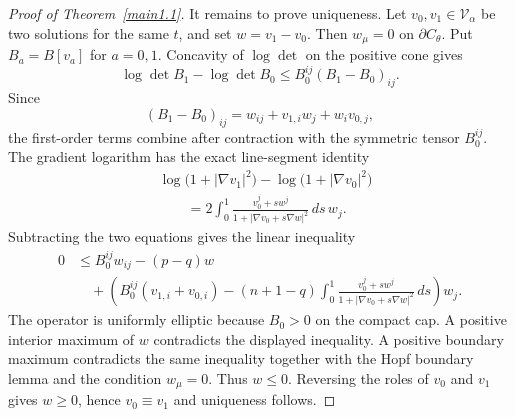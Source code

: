 \documentclass[11pt]{amsart}
\numberwithin{equation} {section}
\numberwithin{equation}{section}
\begin{document}
\begin{proof}[Proof of Theorem~\ref{main1.1}]
\enlargethispage{\baselineskip}
It remains to prove uniqueness. Let $v_0,v_1\in\mathcal V_{\alpha}$ be two
solutions for the same $t$, and set $w=v_1-v_0$. Then $w_{\mu}=0$ on
$\partial C_{\theta}$. Put $B_a=B[v_a]$ for $a=0,1$. Concavity of $\log\det$ on
the positive cone gives
\[
        \log\det B_1-\log\det B_0
        \leq B_0^{ij}(B_1-B_0)_{ij}.
\]
Since
\[
        (B_1-B_0)_{ij}=w_{ij}+v_{1,i}w_j+w_i v_{0,j},
\]
the first-order terms combine after contraction with the symmetric tensor
$B_0^{ij}$. The gradient logarithm has the exact line-segment identity
\[
\begin{split}
        &\log\bigl(1+|\nabla v_1|^2\bigr)
        -\log\bigl(1+|\nabla v_0|^2\bigr)\\
        &\qquad =
        2\int_0^1
        \frac{v_0^j+s w^j}{1+|\nabla v_0+s\nabla w|^2}\,ds\, w_j.
\end{split}
\]
Subtracting the two equations gives the linear inequality
\begin{equation}\label{comparison inequality}
\begin{split}
        0&\leq B_0^{ij}w_{ij}-(p-q)w\\
        &\quad+\left(B_0^{ij}(v_{1,i}+v_{0,i})
        -(n+1-q)\int_0^1
        \frac{v_0^j+s w^j}{1+|\nabla v_0+s\nabla w|^2}\,ds\right)w_j.
\end{split}
\end{equation}
The operator is uniformly elliptic because $B_0>0$ on the compact cap. A
positive interior maximum of $w$ contradicts the displayed inequality. A positive
boundary maximum contradicts the same inequality together with the Hopf boundary
lemma and the condition $w_{\mu}=0$. Thus $w\leq0$. Reversing the roles of
$v_0$ and $v_1$ gives $w\geq0$, hence $v_0\equiv v_1$ and uniqueness follows.
\end{proof}

\end{document}
